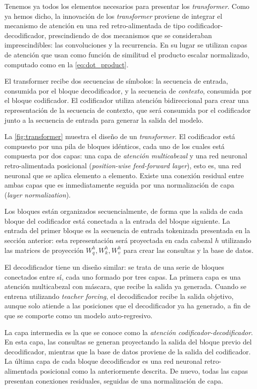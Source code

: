 Tenemos ya todos los elementos necesarios para presentar los \textit{transformer}. Como ya hemos dicho, la innovación de los \textit{transformer} proviene de integrar el mecanismo de atención en una red retro-alimentada de tipo codificador-decodificador, prescindiendo de dos mecanismos que se consideraban imprescindibles: las convoluciones y la recurrencia. En su lugar se utilizan capas de atención que usan como función de similitud el producto escalar normalizado, computado como en la \cref{eq:dot_product}.

El transformer recibe dos secuencias de símbolos: la secuencia de entrada, consumida por el bloque decodificador, y la secuencia de \textit{contexto}, consumida por el bloque codificador. El codificador utiliza atención bidireccional para crear una representación de la secuencia de contexto, que será consumida por el codificador junto a la secuencia de entrada para generar la salida del modelo.

La \cref{fig:transformer} muestra el diseño  de un \textit{transformer}. El codificador está compuesto por una pila de bloques idénticos, cada uno de los cuales está compuesta por dos capas: una capa de \textit{atención multicabezal} y una red neuronal retro-alimentada posicional (\textit{position-wise feed-forward layer}), esto es, una red neuronal que se aplica elemento a elemento. Existe una conexión residual entre ambas capas que es inmediatamente seguida por una normalización de capa (\textit{layer normalization}).

Los bloques están organizados secuencialmente, de forma que la salida de cada bloque del codificador está conectada a la entrada del bloque siguiente. La entrada del primer bloque es la secuencia de entrada tokenizada presentada en la sección anterior: esta representación será proyectada en cada cabezal \( h \) utilizando las matrices de proyección \( W^h_q, W^h_k, W^h_v \) para crear las consultas y la base de datos. 

El decodificador tiene un diseño similar: se trata de una serie de bloques conectados entre sí, cada uno formado por tres capas. La primera capa es una atención multicabezal con máscara, que recibe la salida ya generada. Cuando se entrena utilizando \textit{teacher forcing}, el decodificador recibe la salida objetivo, aunque solo atiende a las posiciones que el decodificador ya ha generado, a fin de que se comporte como un modelo auto-regresivo.

La capa intermedia es la que se conoce como la \textit{atención codificador-decodificador}. En esta capa, las consultas se generan proyectando la salida del bloque previo del decodificador, mientras que la base de datos proviene de la salida del codificador. La última capa de cada bloque decodificador es una red neuronal retro-alimentada posicional como la anteriormente descrita. De nuevo, todas las capas presentan conexiones residuales, seguidas de una normalización de capa.

